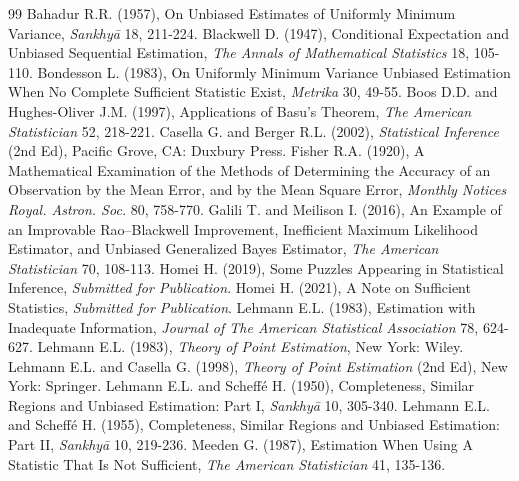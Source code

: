 \documentclass[twoside]{article}
\begin{document}
\begin{thebibliography}{99}
 Bahadur R.R. (1957), On Unbiased Estimates of Uniformly Minimum Variance, {\it Sankhy\={a}} 18, 211-224.
 Blackwell D. (1947), Conditional Expectation and Unbiased Sequential Estimation, {\it The Annals of Mathematical Statistics} 18, 105-110.
 Bondesson L. (1983), On Uniformly Minimum Variance Unbiased Estimation When No Complete Sufficient Statistic Exist, {\it Metrika} 30, 49-55.
 Boos D.D. and Hughes-Oliver J.M. (1997), Applications of Basu's Theorem, {\it The American Statistician} 52, 218-221.
 Casella G. and Berger R.L. (2002), {\it Statistical Inference} (2nd Ed), Pacific Grove, CA: Duxbury Press.
 Fisher R.A. (1920), A Mathematical Examination of the Methods of Determining the Accuracy of an Observation by the Mean Error, and by the Mean Square Error, {\it Monthly Notices Royal. Astron. Soc.} 80, 758-770.
 Galili T. and Meilison I. (2016), An Example of an Improvable Rao--Blackwell Improvement, Inefficient Maximum Likelihood Estimator, and Unbiased Generalized Bayes Estimator, {\it The American Statistician} 70, 108-113.
 Homei H. (2019), Some Puzzles Appearing in Statistical Inference, {\it Submitted for Publication}.
 Homei H. (2021), A Note on Sufficient Statistics, {\it Submitted for Publication}.
 Lehmann E.L. (1983), Estimation with Inadequate Information, {\it Journal of The American Statistical Association} 78, 624-627.
 Lehmann E.L. (1983), {\it Theory of Point Estimation}, New York: Wiley.
 Lehmann E.L. and Casella G. (1998), {\it Theory of Point Estimation} (2nd Ed), New York: Springer.
 Lehmann E.L. and Scheff\'{e} H. (1950), Completeness, Similar Regions and Unbiased Estimation: Part I, {\it Sankhy\={a}} 10, 305-340.
 Lehmann E.L. and Scheff\'{e} H. (1955), Completeness, Similar Regions and Unbiased Estimation: Part II, {\it Sankhy\={a}} 10, 219-236.
 Meeden G. (1987), Estimation When Using A Statistic That Is Not Sufficient, {\it The American Statistician} 41, 135-136.

\end{thebibliography}
\end{document}
